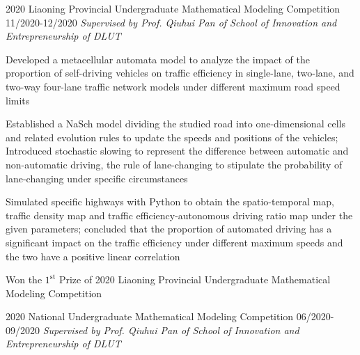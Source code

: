 \begin{cventries2}
    \cventrynew
    {2020 Liaoning Provincial Undergraduate Mathematical Modeling Competition} %
    {11/2020-12/2020} %
    {\textnormal{\textit{Supervised by Prof. Qiuhui Pan of School of Innovation and Entrepreneurship of DLUT}
    }}
    {
      \begin{cvitems} %
        \item Developed a metacellular automata model to analyze the impact of the proportion of self-driving vehicles on traffic efficiency in single-lane, two-lane, and two-way four-lane traffic network models under different maximum road speed limits
        \item Established a NaSch model dividing the studied road into one-dimensional cells and related evolution rules to update the speeds and positions of the vehicles; Introduced stochastic slowing to represent the difference between automatic and non-automatic driving, the rule of lane-changing to stipulate the probability of lane-changing under specific circumstances
        \item Simulated specific highways with Python to obtain the spatio-temporal map, traffic density map and traffic efficiency-autonomous driving ratio map under the given parameters; concluded that the proportion of automated driving has a significant impact on the traffic efficiency under different maximum speeds and the two have a positive linear correlation
        \item Won the $1^{\text{st}}$ Prize of 2020 Liaoning Provincial Undergraduate Mathematical Modeling Competition
      \end{cvitems}
    }       
    \cventrynew
    {2020 National Undergraduate Mathematical Modeling Competition} %
    {06/2020-09/2020} %
    {\textnormal{\textit{Supervised by Prof. Qiuhui Pan of School of Innovation and Entrepreneurship of DLUT}
    }}
    {
      \begin{cvitems} %

\end{cvitems}}
\end{cventries2}
